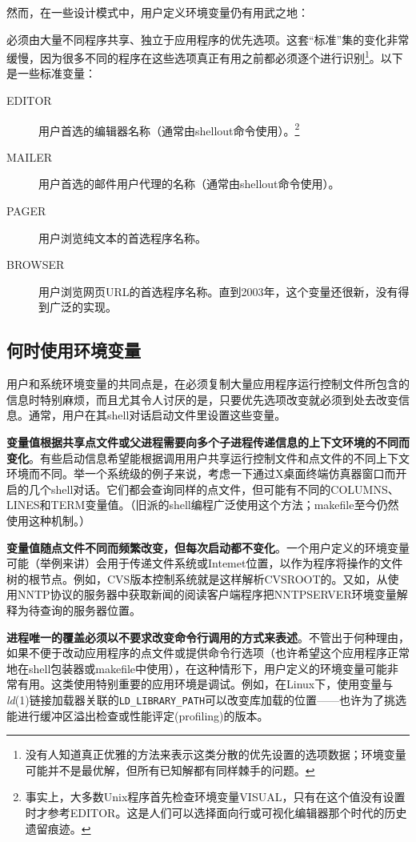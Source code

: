 \documentclass[12pt,oneside]{book}
\begin{document}
\begin{common-format}
然而，在一些设计模式中，用户定义环境变量仍有用武之地：

必须由大量不同程序共享、独立于应用程序的优先选项。这套“标准”集的变化非常缓慢，因为很多不同的程序在这些选项真正有用之前都必须逐个进行识别\footnote{没有人知道真正优雅的方法来表示这类分散的优先设置的选项数据；环境变量可能并不是最优解，但所有已知解都有同样棘手的问题。}。以下是一些标准变量：
\begin{description}
\item[EDITOR] 用户首选的编辑器名称（通常由shellout命令使用）。\footnote{事实上，大多数Unix程序首先检查环境变量VISUAL，只有在这个值没有设置时才参考EDITOR。这是人们可以选择面向行或可视化编辑器那个时代的历史遗留痕迹。}
\item[MAILER] 用户首选的邮件用户代理的名称（通常由shellout命令使用）。
\item[PAGER] 用户浏览纯文本的首选程序名称。
\item[BROWSER] 用户浏览网页URL的首选程序名称。直到2003年，这个变量还很新，没有得到广泛的实现。
\end{description}


\subsection{何时使用环境变量}
用户和系统环境变量的共同点是，在必须复制大量应用程序运行控制文件所包含的信息时特别麻烦，而且尤其令人讨厌的是，只要优先选项改变就必须到处去改变信息。通常，用户在其shell对话启动文件里设置这些变量。

\textbf{变量值根据共享点文件或父进程需要向多个子进程传递信息的上下文环境的不同而变化}。有些启动信息希望能根据调用用户共享运行控制文件和点文件的不同上下文环境而不同。举一个系统级的例子来说，考虑一下通过X桌面终端仿真器窗口而开启的几个shell对话。它们都会查询同样的点文件，但可能有不同的COLUMNS、LINES和TERM变量值。（旧派的shell编程广泛使用这个方法；makefile至今仍然使用这种机制。）

\textbf{变量值随点文件不同而频繁改变，但每次启动都不变化}。一个用户定义的环境变量可能（举例来讲）会用于传递文件系统或Intemet位置，以作为程序将操作的文件树的根节点。例如，CVS版本控制系统就是这样解析CVSROOT的。又如，从使用NNTP协议的服务器中获取新闻的阅读客户端程序把NNTPSERVER环境变量解释为待查询的服务器位置。

\textbf{进程唯一的覆盖必须以不要求改变命令行调用的方式来表述}。不管出于何种理由，如果不便于改动应用程序的点文件或提供命令行选项（也许希望这个应用程序正常地在shell包装器或makefile中使用），在这种情形下，用户定义的环境变量可能非常有用。这类使用特别重要的应用环境是调试。例如，在Linux下，使用变量与\textit{ld}(1)链接加载器关联的\verb+LD_LIBRARY_PATH+可以改变库加载的位置——也许为了挑选能进行缓冲区溢出检查或性能评定(profiling)的版本。


\end{common-format}
\end{document}
